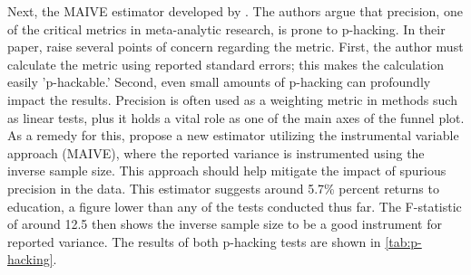 Next, the \ac{MAIVE} estimator developed by \cite{irsova2023maive}. The authors argue that precision, one of the critical metrics in meta-analytic research, is prone to p-hacking. In their paper, \cite{irsova2023maive} raise several points of concern regarding the metric. First, the author must calculate the metric using reported standard errors; this makes the calculation easily 'p-hackable.' Second, even small amounts of p-hacking can profoundly impact the results. Precision is often used as a weighting metric in methods such as linear tests, plus it holds a vital role as one of the main axes of the funnel plot. As a remedy for this, \cite{irsova2023maive} propose a new estimator utilizing the instrumental variable approach (\ac{MAIVE}), where the reported variance is instrumented using the inverse sample size. This approach should help mitigate the impact of spurious precision in the data. This estimator suggests around 5.7\% percent returns to education, a figure lower than any of the tests conducted thus far. The F-statistic of around 12.5 then shows the inverse sample size to be a good instrument for reported variance. The results of both p-hacking tests are shown in \autoref{tab:p-hacking}.


